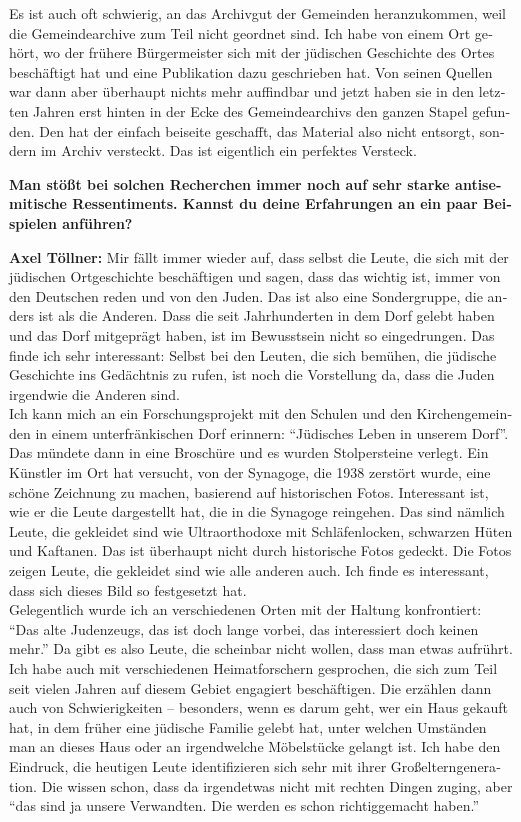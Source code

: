 \begin{otherlanguage}{ngerman}
Es ist auch oft schwierig, an das Archivgut der Gemeinden heranzukommen, weil die Gemeindearchive zum Teil nicht geordnet sind. Ich habe von einem Ort gehört, wo der frühere Bürgermeister sich mit der jüdischen Geschichte des Ortes beschäftigt hat und eine Publikation dazu geschrieben hat. Von seinen Quellen war dann aber überhaupt nichts mehr auffindbar und jetzt haben sie in den letzten Jahren erst hinten in der Ecke des Gemeindearchivs den ganzen Stapel gefunden. Den hat der einfach beiseite geschafft, das Material also nicht entsorgt, sondern im Archiv versteckt. Das ist eigentlich ein perfektes Versteck. 

\textbf{Man stößt bei solchen Recherchen immer noch auf sehr starke antisemitische Ressentiments. Kannst du deine Erfahrungen an ein paar Beispielen anführen?} 

\textbf{Axel Töllner:} Mir fällt immer wieder auf, dass selbst die Leute, die sich mit der jüdischen Ortgeschichte beschäftigen und sagen, dass das wichtig ist, immer von den Deutschen reden und von den Juden. Das ist also eine Sondergruppe, die anders ist als die Anderen. Dass die seit Jahrhunderten in dem Dorf gelebt haben und das Dorf mitgeprägt haben, ist im Bewusstsein nicht so eingedrungen. Das finde ich sehr interessant: Selbst bei den Leuten, die sich bemühen, die jüdische Geschichte ins Gedächtnis zu rufen, ist noch die Vorstellung da, dass die Juden irgendwie die Anderen sind.\\  
Ich kann mich an ein Forschungsprojekt mit den Schulen und den Kirchengemeinden in einem unterfränkischen Dorf erinnern: "`Jüdisches Leben in unserem Dorf"'. Das mündete dann in eine Broschüre und es wurden Stolpersteine verlegt. Ein Künstler im Ort hat versucht, von der Synagoge, die 1938 zerstört wurde, eine schöne Zeichnung zu machen, basierend auf historischen Fotos. Interessant ist, wie er die Leute dargestellt hat, die in die Synagoge reingehen. Das sind nämlich Leute, die gekleidet sind wie Ultraorthodoxe mit Schläfenlocken, schwarzen Hüten und Kaftanen. Das ist überhaupt nicht durch historische Fotos gedeckt. Die Fotos zeigen Leute, die gekleidet sind wie alle anderen auch. Ich finde es interessant, dass sich dieses Bild so festgesetzt hat.\\ 
Gelegentlich wurde ich an verschiedenen Orten mit der Haltung konfrontiert: "`Das alte Judenzeugs, das ist doch lange vorbei, das interessiert doch keinen mehr."' Da gibt es also Leute, die scheinbar nicht wollen, dass man etwas aufrührt. Ich habe auch mit verschiedenen Heimatforschern gesprochen, die sich zum Teil seit vielen Jahren auf diesem Gebiet engagiert beschäftigen. Die erzählen dann auch von Schwierigkeiten – besonders, wenn es darum geht, wer ein Haus gekauft hat, in dem früher eine jüdische Familie gelebt hat, unter welchen Umständen man an dieses Haus oder an irgendwelche Möbelstücke gelangt ist.  
Ich habe den Eindruck, die heutigen Leute identifizieren sich sehr mit ihrer Großelterngeneration. Die wissen schon, dass da irgendetwas nicht mit rechten Dingen zuging, aber "`das sind ja unsere Verwandten. Die werden es schon richtiggemacht haben."' 


\end{otherlanguage}
